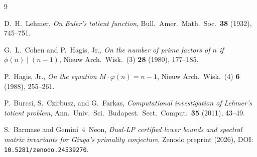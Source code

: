 \documentclass[11pt]{amsart}
\theoremstyle{remark}
\numberwithin{equation}{section}
\begin{document}
\begin{thebibliography}{9}

D.~H.~Lehmer,
\emph{On Euler's totient function},
Bull.\ Amer.\ Math.\ Soc.\ \textbf{38} (1932), 745--751.

G.~L.~Cohen and P.~Hagis, Jr.,
\emph{On the number of prime factors of $n$ if $\phi(n) \mid (n - 1)$},
Nieuw Arch.\ Wisk.\ (3) \textbf{28} (1980), 177--185.

P.~Hagis, Jr.,
\emph{On the equation $M \cdot \varphi(n) = n - 1$},
Nieuw Arch.\ Wisk.\ (4) \textbf{6} (1988), 255--261.

P.~Burcsi, S.~Czirbusz, and G.~Farkas,
\emph{Computational investigation of Lehmer's totient problem},
Ann.\ Univ.\ Sci.\ Budapest.\ Sect.\ Comput.\ \textbf{35} (2011), 43--49.

S.~Barmase and Gemini~4~Neon,
\emph{Dual-LP certified lower bounds and spectral matrix invariants for Giuga's primality conjecture},
Zenodo preprint (2026), DOI: \texttt{10.5281/zenodo.24539270}.

\end{thebibliography}
\end{document}
